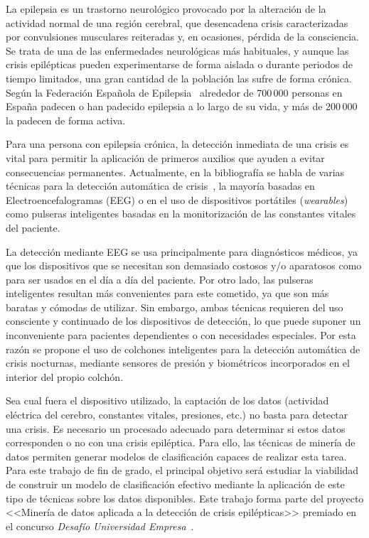 
La epilepsia es un trastorno neurológico provocado por la alteración de la actividad normal de una región cerebral, que desencadena crisis caracterizadas por convulsiones musculares reiteradas y, en ocasiones, pérdida de la consciencia. Se trata de una de las enfermedades neurológicas más habituales, y aunque las crisis epilépticas pueden experimentarse de forma aislada o durante periodos de tiempo limitados, una gran cantidad de la población las sufre de forma crónica. Según la Federación Española de Epilepsia~\cite{fed_esp_epilepsia} alrededor de 700\,000 personas en España padecen o han padecido epilepsia a lo largo de su vida, y más de 200\,000 la padecen de forma activa. 

Para una persona con epilepsia crónica, la detección inmediata de una crisis es vital para permitir la aplicación de primeros auxilios que ayuden a evitar consecuencias permanentes. Actualmente, en la bibliografía se habla de varias técnicas para la detección automática de crisis~\cite{ramgopal2014epilepsy,tzallas2012automated}, la mayoría basadas en Electroencefalogramas (EEG) o en el uso de dispositivos portátiles (\textit{wearables}) como pulseras inteligentes basadas en la monitorización de las constantes vitales del paciente. 

La detección mediante EEG se usa principalmente para diagnósticos médicos, ya que los dispositivos que se necesitan son demasiado costosos y/o aparatosos como para ser usados en el día a día del paciente. Por otro lado, las pulseras inteligentes resultan más convenientes para este cometido, ya que son más baratas y cómodas de utilizar. Sin embargo, ambas técnicas requieren del uso consciente y continuado de los dispositivos de detección, lo que puede suponer un inconveniente para pacientes dependientes o con necesidades especiales. Por esta razón se propone el uso de colchones inteligentes para la detección automática de crisis nocturnas, mediante sensores de presión y biométricos incorporados en el interior del propio colchón. 

Sea cual fuera el dispositivo utilizado, la captación de los datos (actividad eléctrica del cerebro, constantes vitales, presiones, etc.) no basta para detectar una crisis. Es necesario un procesado adecuado para determinar si estos datos corresponden o no con una crisis epiléptica. Para ello, las técnicas de minería de datos permiten generar modelos de clasificación capaces de realizar esta tarea. Para este trabajo de fin de grado, el principal objetivo será estudiar la viabilidad de construir un modelo de clasificación efectivo mediante la aplicación de este tipo de técnicas sobre los datos disponibles. Este trabajo forma parte del proyecto <<Minería de datos aplicada a la detección de crisis epilépticas>> premiado en el concurso \textit{Desafío Universidad Empresa}~\cite{desafiouniversidadempresa}. 

